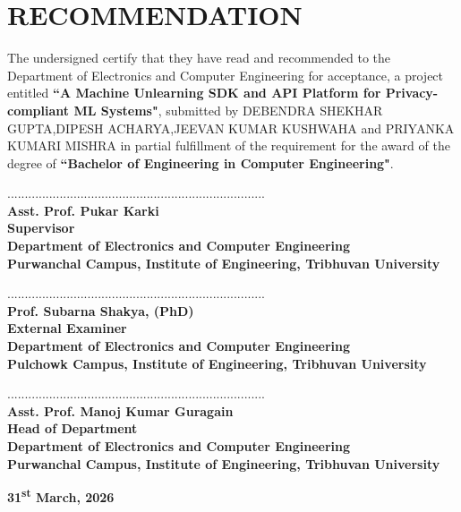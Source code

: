\chapter*{\textbf{RECOMMENDATION}}
The undersigned certify that they have read and recommended to the Department of
Electronics and Computer Engineering for acceptance, a project entitled \textbf{``A  Machine Unlearning SDK and API Platform for Privacy-compliant ML Systems"}, submitted by {DEBENDRA SHEKHAR GUPTA,DIPESH ACHARYA,JEEVAN KUMAR KUSHWAHA and PRIYANKA KUMARI MISHRA} in partial fulfillment of the requirement for the award of the degree of \textbf{``Bachelor of Engineering in Computer Engineering"}.\par
        \vspace{0.8cm}
..........................................................................\\
\textbf{Asst. Prof. Pukar Karki\\
Supervisor\\
Department of Electronics and Computer Engineering\\
Purwanchal Campus, Institute of Engineering, Tribhuvan University}\par
        \vspace{1cm}
..........................................................................\\
\textbf{Prof. Subarna Shakya, (PhD)\\
External Examiner \\
Department of Electronics and Computer Engineering\\
Pulchowk Campus, Institute of Engineering, Tribhuvan University}\par
        \vspace{1cm}
..........................................................................\\
\textbf{
Asst. Prof. Manoj Kumar Guragain\\ 
Head of Department \\
Department of Electronics and Computer Engineering\\Purwanchal Campus, Institute of Engineering, Tribhuvan University}\par
\vspace{2.0cm}

\begin{center}
\textbf{31\textsuperscript{st} March, 2026}
\end{center}
\newpage

